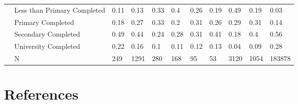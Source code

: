 \documentclass[
]{article}
\begin{document}
\begin{landscape}
\begin{table}[ht]
\begin{tabular}{l|l|lllllllll}
   & Less than Primary Completed & 0.11 & 0.13 & 0.33 & 0.4 & 0.26 & 0.19 & 0.49 & 0.19 & 0.03 \\ 
   & Primary Completed & 0.18 & 0.27 & 0.33 & 0.2 & 0.31 & 0.26 & 0.29 & 0.31 & 0.14 \\ 
   & Secondary Completed & 0.49 & 0.44 & 0.24 & 0.28 & 0.31 & 0.41 & 0.18 & 0.4 & 0.56 \\ 
   & University Completed & 0.22 & 0.16 & 0.1 & 0.11 & 0.12 & 0.13 & 0.04 & 0.09 & 0.28 \\ 
   & N & 249 & 1291 & 280 & 168 & 95 & 53 & 3120 & 1054 & 183878 \\ 
   \hline
\end{tabular}
\endgroup
\end{table}
\end{landscape}

\newpage

\section*{References}\label{references}
\end{document}
